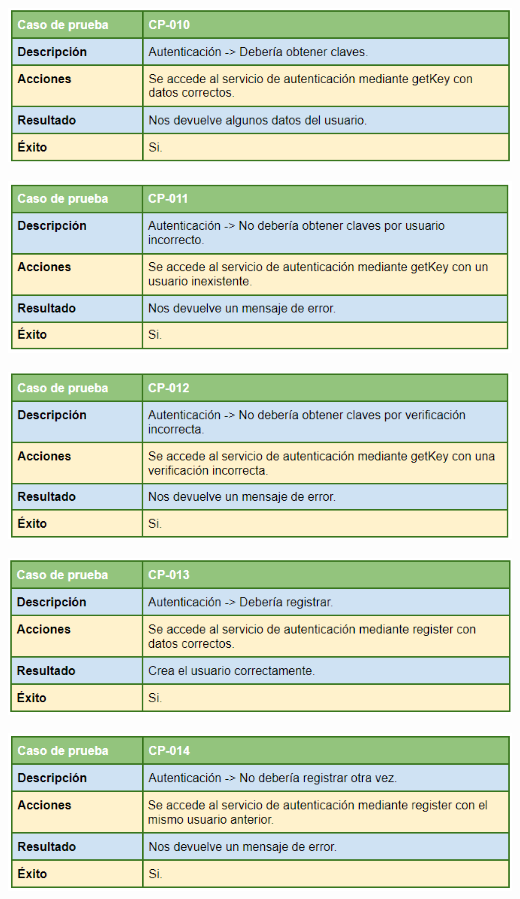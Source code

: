 \bigskip

\includegraphics[width=\textwidth]{img/cap7/cp-010.png}

\bigskip

\includegraphics[width=\textwidth]{img/cap7/cp-011.png}

\bigskip

\includegraphics[width=\textwidth]{img/cap7/cp-012.png}

\bigskip

\includegraphics[width=\textwidth]{img/cap7/cp-013.png}

\bigskip

\includegraphics[width=\textwidth]{img/cap7/cp-014.png}

